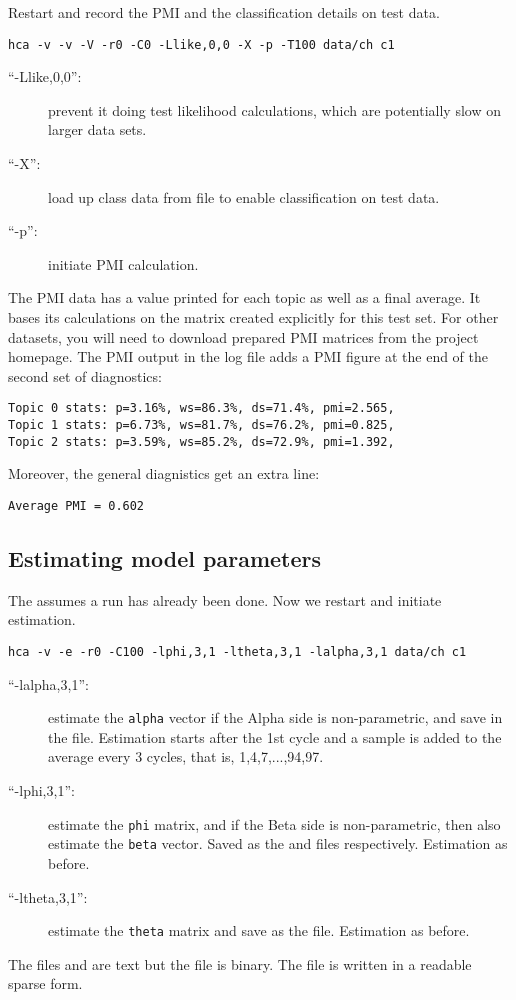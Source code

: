\documentclass[a4paper,english]{article}
\begin{document}
Restart and record the 
PMI and the classification details on test data.
\begin{verbatim}
hca -v -v -V -r0 -C0 -Llike,0,0 -X -p -T100 data/ch c1
\end{verbatim}
\begin{description}
\item[``-Llike,0,0'':] prevent it 
doing test likelihood calculations, which are potentially slow
on larger data sets.
\item[``-X'':] load up class data from  file to
enable classification on test data.
\item[``-p'':] initiate PMI calculation.
\end{description}
The PMI data has a value printed for each topic as well as a 
final average.  It bases its calculations on the matrix
 created explicitly for this test set.
For other datasets, you will need to download prepared
PMI matrices from the project homepage.
The PMI output in the log file 
adds a PMI figure at the end of the second set of
diagnostics:
\begin{verbatim}
Topic 0 stats: p=3.16%, ws=86.3%, ds=71.4%, pmi=2.565,
Topic 1 stats: p=6.73%, ws=81.7%, ds=76.2%, pmi=0.825,
Topic 2 stats: p=3.59%, ws=85.2%, ds=72.9%, pmi=1.392,
\end{verbatim}
Moreover, the general diagnistics get an extra line:
\begin{verbatim}
Average PMI = 0.602
\end{verbatim}

\subsection{Estimating model parameters}

The assumes a run has already been done.
Now we restart and initiate estimation.
\begin{verbatim}
hca -v -e -r0 -C100 -lphi,3,1 -ltheta,3,1 -lalpha,3,1 data/ch c1
\end{verbatim}
\begin{description}
\item[``-lalpha,3,1'':] estimate the \texttt{alpha} vector if
the Alpha side is non-parametric, and save
in the  file.
Estimation starts after the 1st cycle and a sample is added to the
average every 3 cycles,
that is, 1,4,7,...,94,97.
\item[``-lphi,3,1'':] estimate the \texttt{phi} matrix, and if
the Beta side is non-parametric, then also estimate the
\texttt{beta} vector.
Saved as the  and  files respectively.
Estimation as before.
\item[``-ltheta,3,1'':] estimate the \texttt{theta} matrix
and save as the  file.
Estimation as before.
\end{description}
The files  and  are text but
the file  is binary.
The file  is written in a readable sparse form.
\end{document}
